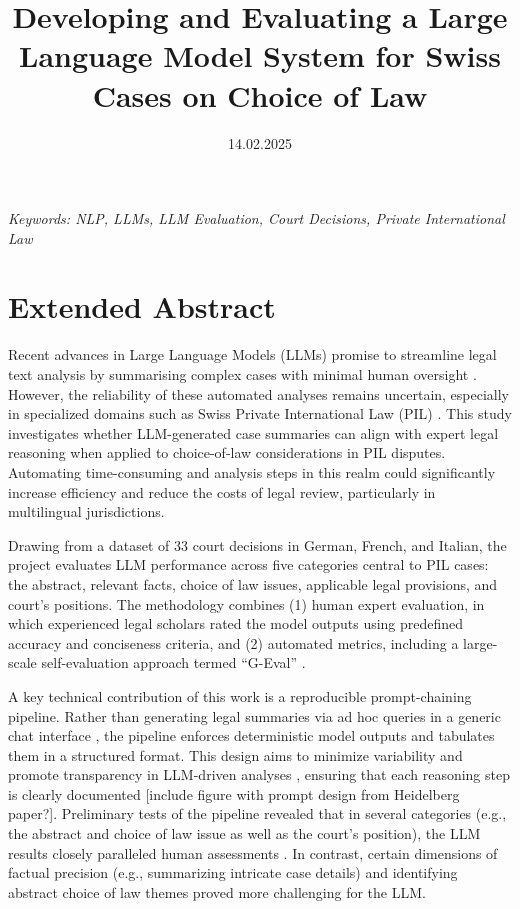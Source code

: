 \documentclass[a4paper,12pt]{article}
\title{Developing and Evaluating a Large Language Model System for Swiss Cases on Choice of Law}
\date{14.02.2025}
\begin{document}
\maketitle
\thispagestyle{fancy}

\begin{center}
\textit{Keywords: NLP, LLMs, LLM Evaluation, Court Decisions, Private International Law}
\newline
\end{center}

\section*{Extended Abstract}

Recent advances in Large Language Models (LLMs) promise to streamline legal text analysis by summarising complex cases with minimal human oversight \cite{}. However, the reliability of these automated analyses remains uncertain, especially in specialized domains such as Swiss Private International Law (PIL) \cite{}. This study investigates whether LLM-generated case summaries can align with expert legal reasoning when applied to choice-of-law considerations in PIL disputes. Automating time-consuming and analysis steps in this realm could significantly increase efficiency and reduce the costs of legal review, particularly in multilingual jurisdictions.

Drawing from a dataset of 33 court decisions in German, French, and Italian, the project evaluates LLM performance across five categories central to PIL cases: the abstract, relevant facts, choice of law issues, applicable legal provisions, and court's positions. The methodology combines (1) human expert evaluation, in which experienced legal scholars rated the model outputs using predefined accuracy and conciseness criteria, and (2) automated metrics, including a large-scale self-evaluation approach termed ``G-Eval'' \cite{G-Eval}.

A key technical contribution of this work is a reproducible prompt-chaining pipeline. Rather than generating legal summaries via ad hoc queries in a generic chat interface \cite{}, the pipeline enforces deterministic model outputs and tabulates them in a structured format. This design aims to minimize variability and promote transparency in LLM-driven analyses \cite{}, ensuring that each reasoning step is clearly documented [include figure with prompt design from Heidelberg paper?]. Preliminary tests of the pipeline revealed that in several categories (e.g., the abstract and choice of law issue as well as the court's position), the LLM results closely paralleled human assessments \cite{Heidelberg [ask AB, which categories were particularly good/bad]}. In contrast, certain dimensions of factual precision (e.g., summarizing intricate case details) and identifying abstract choice of law themes proved more challenging for the LLM.
\end{document}
